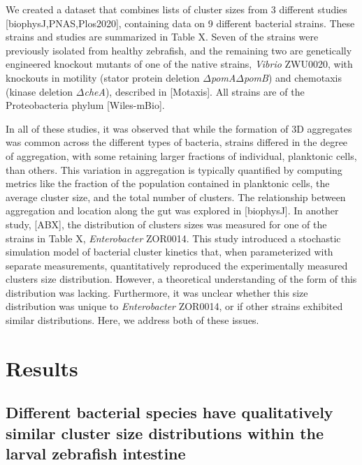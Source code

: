 \documentclass[aps,pre,twocolumn]{revtex4-1}
\begin{document}
We created a dataset that combines lists of cluster sizes from 3 different studies [biophysJ,PNAS,Plos2020], containing data on 9 different bacterial strains. These strains and studies are summarized in Table X. Seven of the strains were previously isolated from healthy zebrafish, and the remaining two are genetically engineered knockout mutants of one of the native strains, \textit{Vibrio} ZWU0020, with knockouts in motility (stator protein deletion $\Delta$\textit{pomA}$\Delta$\textit{pomB}) and chemotaxis (kinase deletion $\Delta$\textit{cheA}), described in [Motaxis]. All strains are of the Proteobacteria phylum [Wiles-mBio].

In all of these studies, it was observed that while the formation of 3D aggregates was common across the different types of bacteria, strains differed in the degree of aggregation, with some retaining larger fractions of individual, planktonic cells, than others. This variation in aggregation is typically quantified by computing metrics like the fraction of the population contained in planktonic cells, the average cluster size, and the total number of clusters. The relationship between aggregation and location along the gut was explored in [biophysJ]. In another study, [ABX], the distribution of clusters sizes was measured for one of the strains in Table X, \textit{Enterobacter} ZOR0014. This study introduced a stochastic simulation model of bacterial cluster kinetics that, when parameterized with separate measurements, quantitatively reproduced the experimentally measured clusters size distribution. However, a theoretical understanding of the form of this distribution was lacking. Furthermore, it was unclear whether this size distribution was unique to  \textit{Enterobacter} ZOR0014, or if other strains exhibited similar distributions. Here, we address both of these issues. 


\section{Results}
\subsection{Different bacterial species have qualitatively similar cluster size distributions within the larval zebrafish intestine}
\end{document}

